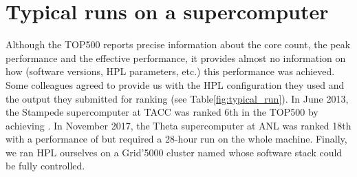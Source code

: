     \section{Typical runs on a supercomputer}%
    \label{sec:hpl:typical_runs}

        Although the TOP500 reports precise information about the core count,
        the peak performance and the effective performance, it provides almost
        no information on how (software versions, HPL parameters, etc.) this
        performance was achieved. Some colleagues agreed to provide us with
        the HPL configuration they used and the output they submitted for
        ranking (see Table\ref{fig:typical_run}).
        In June 2013, the Stampede supercomputer at TACC was ranked
        6th in the TOP500 by achieving . In November
        2017, the Theta supercomputer at ANL was ranked 18th with a performance of 
        but required a 28-hour run on the
        whole machine. Finally, we ran HPL ourselves on a Grid'5000 cluster
        named \dahu whose software stack could be fully controlled.

